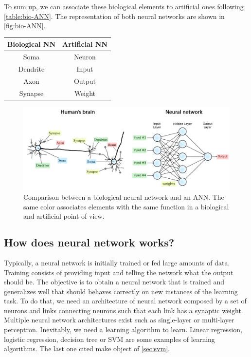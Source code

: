 \documentclass[11pt, openany]{report}
\theoremstyle{plain}
\theoremstyle{definition}
\theoremstyle{remark}
\begin{document}
To sum up, we can associate these biological elements to artificial ones following \autoref{table:bio-ANN}. The representation of both neural networks are shown in \autoref{fig:bio-ANN}. 

\begin{center}
    \begin{tabular}{|c|c|}
      \hline
      Biological NN & Artificial NN \\
      \hline
      Soma & Neuron \\
      \hline
      Dendrite & Input \\
      \hline
      Axon & Output \\
      \hline
      Synapse & Weight \\
      \hline
    \end{tabular}
    \label{table:bio-ANN}
\end{center}

\begin{figure}[h]
  \centering
  \includegraphics[scale=0.25]{figures/brainVSneuralnet.png}
  \caption{Comparison between a biological neural network and an ANN. The same color associates elements with the same function in a biological and artificial point of view.}
  \label{fig:bio-ANN}
\end{figure}

\subsection{How does neural network works?} \label{sec:nn-work}
Typically, a neural network is initially trained or fed large amounts of data. Training consists of providing input and telling the network what the output should be. The objective is to obtain a neural network that is trained and generalizes well that should behaves correctly on new instances of the learning task. To do that, we need an architecture of neural network composed by a set of neurons and links connecting neurons such that each link has a synaptic weight. Multiple neural network architectures exist such as single-layer or multi-layer perceptron. Inevitably, we need a learning algorithm to learn. Linear regression, logistic regression, decision tree or SVM are some examples of learning algorithms. The last one cited make object of \autoref{sec:svm}. 
\end{document}
